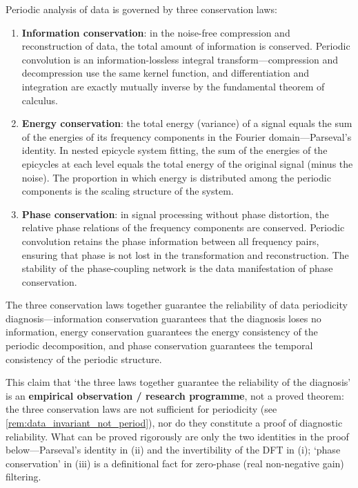 \begin{remark}\label{thm:data_conservation}
Periodic analysis of data is governed by three conservation laws:
\begin{enumerate}[label=(\roman*)]
    \item \textbf{Information conservation}: in the noise-free compression and reconstruction of data, the total amount of information is conserved. Periodic convolution is an information-lossless integral transform---compression and decompression use the same kernel function, and differentiation and integration are exactly mutually inverse by the fundamental theorem of calculus.
    \item \textbf{Energy conservation}: the total energy (variance) of a signal equals the sum of the energies of its frequency components in the Fourier domain---Parseval's identity. In nested epicycle system fitting, the sum of the energies of the epicycles at each level equals the total energy of the original signal (minus the noise). The proportion in which energy is distributed among the periodic components is the scaling structure of the system.
    \item \textbf{Phase conservation}: in signal processing without phase distortion, the relative phase relations of the frequency components are conserved. Periodic convolution retains the phase information between all frequency pairs, ensuring that phase is not lost in the transformation and reconstruction. The stability of the phase-coupling network is the data manifestation of phase conservation.
\end{enumerate}
The three conservation laws together guarantee the reliability of data periodicity diagnosis---information conservation guarantees that the diagnosis loses no information, energy conservation guarantees the energy consistency of the periodic decomposition, and phase conservation guarantees the temporal consistency of the periodic structure.

This claim that `the three laws together guarantee the reliability of the diagnosis' is an \textbf{empirical observation / research programme}, not a proved theorem: the three conservation laws are not sufficient for periodicity (see \cref{rem:data_invariant_not_period}), nor do they constitute a proof of diagnostic reliability. What can be proved rigorously are only the two identities in the proof below---Parseval's identity in (ii) and the invertibility of the DFT in (i); `phase conservation' in (iii) is a definitional fact for zero-phase (real non-negative gain) filtering.
\end{remark}

